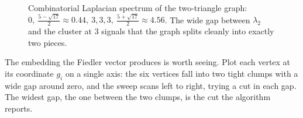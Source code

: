 \begin{figure}[H]
\centering
{}
\caption{Combinatorial Laplacian spectrum of the two-triangle graph: $0,\ \tfrac{5-\sqrt{17}}{2}\!\approx\!0.44,\ 3,3,3,\ \tfrac{5+\sqrt{17}}{2}\!\approx\!4.56$. The wide gap between $\lambda_2$ and the cluster at $3$ signals that the graph splits cleanly into exactly two pieces.}
\label{ch32:spectrum-fig}
\end{figure}

The embedding the Fiedler vector produces is worth seeing. Plot each vertex at its coordinate $g_i$ on a single axis: the six vertices fall into two tight clumps with a wide gap around zero, and the sweep scans left to right, trying a cut in each gap. The widest gap, the one between the two clumps, is the cut the algorithm reports.

